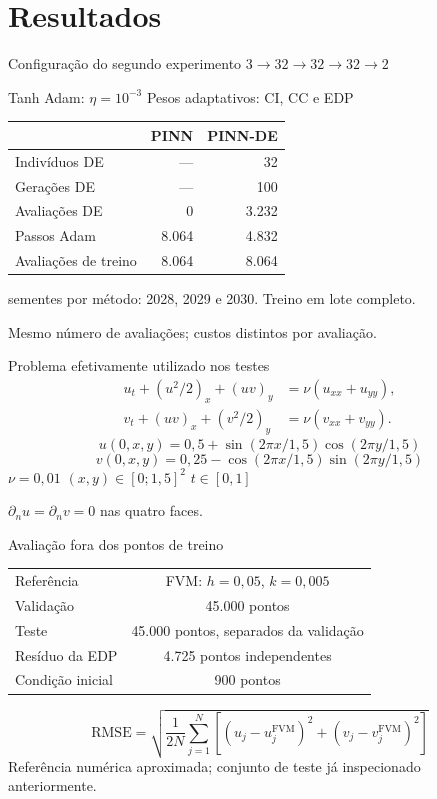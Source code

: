 \section{Resultados}

\begin{frame}{Configuração do segundo experimento}
\centering
\large $3 \rightarrow 32 \rightarrow 32 \rightarrow 32 \rightarrow 2$

\medskip
\normalsize Tanh \quad Adam: $\eta=10^{-3}$ \quad Pesos adaptativos: CI, CC e EDP

\bigskip
\begin{tabular}{lrr}
\toprule
& PINN & PINN-DE \\
\midrule
Indivíduos DE & --- & 32 \\
Gerações DE & --- & 100 \\
Avaliações DE & 0 & 3.232 \\
Passos Adam & 8.064 & 4.832 \\
Avaliações de treino & 8.064 & 8.064 \\
\bottomrule
\end{tabular}

 sementes por método: 2028, 2029 e 2030. Treino em lote completo.

\smallskip
\footnotesize Mesmo número de avaliações; custos distintos por avaliação.
\end{frame}

\begin{frame}{Problema efetivamente utilizado nos testes}
\begin{align*}
u_t+(u^2/2)_x+(uv)_y &= \nu(u_{xx}+u_{yy}),\\
v_t+(uv)_x+(v^2/2)_y &= \nu(v_{xx}+v_{yy}).
\end{align*}
\[
u(0,x,y)=0{,}5+\sin(2\pi x/1{,}5)\cos(2\pi y/1{,}5)
\]
\[
v(0,x,y)=0{,}25-\cos(2\pi x/1{,}5)\sin(2\pi y/1{,}5)
\]
\centering
$\nu=0{,}01$ \quad $(x,y)\in[0;1{,}5]^2$ \quad $t\in[0,1]$

\medskip
$\partial_n u=\partial_n v=0$ nas quatro faces.
\end{frame}

\begin{frame}{Avaliação fora dos pontos de treino}
\centering
\begin{tabular}{lc}
\toprule
Referência & FVM: $h=0{,}05$, $k=0{,}005$ \\
Validação & 45.000 pontos \\
Teste & 45.000 pontos, separados da validação \\
Resíduo da EDP & 4.725 pontos independentes \\
Condição inicial & 900 pontos \\
\bottomrule
\end{tabular}

\bigskip
\[
\mathrm{RMSE}=\sqrt{\frac{1}{2N}\sum_{j=1}^{N}
\left[(u_j-u_j^{\mathrm{FVM}})^2+(v_j-v_j^{\mathrm{FVM}})^2\right]}
\]
\medskip
\footnotesize Referência numérica aproximada; conjunto de teste já inspecionado anteriormente.
\end{frame}

